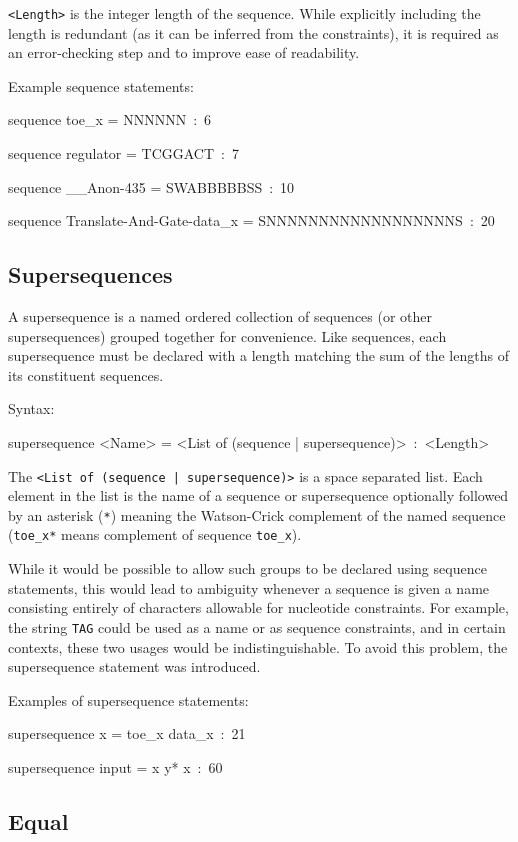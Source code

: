 \documentclass{article}
\newenvironment{code}
{\vspace{-0.1in}\par\begin{list}{}{
\setlength{\listparindent}{0pt}
\raggedright
\setlength{\itemsep}{0pt}
\setlength{\parsep}{0pt}
\normalfont\ttfamily}
 \item[]}
{\end{list}\vspace{-0.1in}}
\begin{document}
\texttt{<Length>} is the integer length of the sequence. While explicitly including the length is redundant (as it can be inferred from the constraints), it is required as an error-checking step and to improve ease of readability.

Example sequence statements:
\begin{code}
sequence toe\_x = NNNNNN~:~6

sequence regulator = TCGGACT~:~7

sequence \_\_Anon-435 = SWABBBBBSS~:~10

sequence Translate-And-Gate-data\_x = SNNNNNNNNNNNNNNNNNNS~:~20
\end{code}

\subsection{Supersequences}

A supersequence is a named ordered collection of sequences (or other supersequences) grouped together for convenience. Like sequences, each supersequence must be declared with a length matching the sum of the lengths of its constituent sequences.

Syntax:
\begin{code}
supersequence <Name> = <List of (sequence | supersequence)>~:~<Length>
\end{code}
The \texttt{<List of (sequence | supersequence)>} is a space separated list. Each element in the list is the name of a sequence or supersequence optionally followed by an asterisk (\texttt{*}) meaning the Watson-Crick complement of the named sequence (\texttt{toe\_x*} means complement of sequence \texttt{toe\_x}).

While it would be possible to allow such groups to be declared using sequence statements, this would lead to ambiguity whenever a sequence is given a name consisting entirely of characters allowable for nucleotide constraints. For example, the string \texttt{TAG} could be used as a name or as sequence constraints, and in certain contexts, these two usages would be indistinguishable. To avoid this problem, the supersequence statement was introduced.

Examples of supersequence statements:
\begin{code}
supersequence x = toe\_x data\_x~:~21

supersequence input = x y{*} x~:~60
\end{code}

\subsection{Equal}
\end{document}
